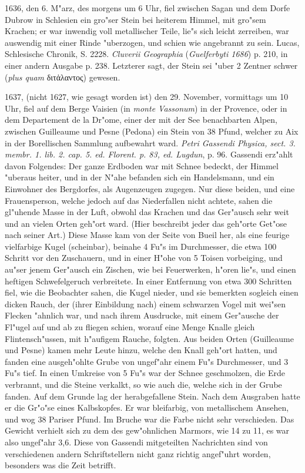 \documentclass[a4paper, 11pt, oneside, polutonikogreek, german]{article}
\begin{document}
1636, den 6. M"arz, des morgens um 6 Uhr, fiel zwischen Sagan und dem Dorfe Dubrow in Schlesien ein gro"ser Stein bei heiterem Himmel, mit gro"sem Krachen; er war inwendig voll metallischer Teile, lie"s sich leicht zerreiben, war auswendig mit einer Rinde "uberzogen, und schien wie angebrannt zu sein. Lucas, Schlesische Chronik, S. 2228. \emph{Cluverii Geographia} (\emph{Guelferbyti 1686}) p. 210, in einer andern Ausgabe p. 238. Letzterer sagt, der Stein sei "uber 2 Zentner schwer (\emph{plus quam} διτἀλαντος) gewesen.

1637, (nicht 1627, wie gesagt worden ist) den 29. November, vormittags um 10 Uhr, fiel auf dem Berge Vaisien (in \emph{monte Vassonum}) in der Provence, oder in dem Departement de la Dr"ome, einer der mit der See benachbarten Alpen, zwischen Guilleaume und Pesne (Pedona) ein Stein von 38 Pfund, welcher zu Aix in der Borellischen Sammlung aufbewahrt ward. \emph{Petri Gassendi Physica, sect. 3. membr. 1. lib. 2. cap. 5. ed. Florent. p. 83, ed. Lugdun}, p. 96. Gassendi erz"ahlt davon Folgendes: Der ganze Erdboden war mit Schnee bedeckt, der Himmel "uberaus heiter, und in der N"ahe befanden sich ein Handelsmann, und ein Einwohner des Bergdorfes, als Augenzeugen zugegen. Nur diese beiden, und eine Frauensperson, welche jedoch auf das Niederfallen nicht achtete, sahen die gl"uhende Masse in der Luft, obwohl das Krachen und das Ger"ausch sehr weit und an vielen Orten geh"ort ward. (Hier beschreibt jeder das geh"orte Get"ose nach seiner Art.) Diese Masse kam von der Seite von Bueil her, als eine feurige vielfarbige Kugel (scheinbar), beinahe 4 Fu"s im Durchmesser, die etwa 100 Schritt vor den Zuschauern, und in einer H"ohe von 5 Toisen vorbeiging, und au"ser jenem Ger"ausch ein Zischen, wie bei Feuerwerken, h"oren lie"s, und einen heftigen Schwefelgeruch verbreitete. In einer Entfernung von etwa 300 Schritten fiel, wie die Beobachter sahen, die Kugel nieder, und sie bemerkten sogleich einen dicken Rauch, der (ihrer Einbildung nach) einem schwarzen Vogel mit wei"sen Flecken "ahnlich war, und nach ihrem Ausdrucke, mit einem Ger"ausche der Fl"ugel auf und ab zu fliegen schien, worauf eine Menge Knalle gleich Flintensch"ussen, mit h"aufigem Rauche, folgten. Aus beiden Orten (Guilleaume und Pesne) kamen mehr Leute hinzu, welche den Knall geh"ort hatten, und fanden eine ausgeh"ohlte Grube von ungef"ahr einem Fu"s Durchmesser, und 3 Fu"s tief. In einen Umkreise von 5 Fu"s war der Schnee geschmolzen, die Erde verbrannt, und die Steine verkalkt, so wie auch die, welche sich in der Grube fanden. Auf dem Grunde lag der herabgefallene Stein. Nach dem Ausgraben hatte er die Gr"o"se eines Kalbskopfes. Er war bleifarbig, von metallischem Ansehen, und wog 38 Pariser Pfund. Im Bruche war die Farbe nicht sehr verschieden. Das Gewicht verhielt sich zu dem des gew"ohnlichen Marmors, wie 14 zu 11, es war also ungef"ahr 3,6. Diese von Gassendi mitgeteilten Nachrichten sind von verschiedenen andern Schriftstellern nicht ganz richtig angef"uhrt worden, besonders was die Zeit betrifft.
\end{document}

